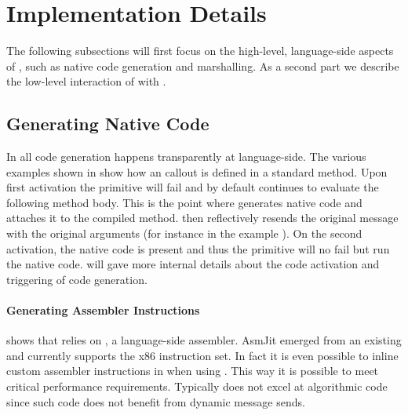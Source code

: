 \section{Implementation Details}

The following subsections will first focus on the high-level, language-side aspects of \NB, such as native code generation and marshalling.
As a second part we describe the low-level interaction of \NB with \B.

\subsection{Generating Native Code}

In \NB all code generation happens transparently at language-side.
The various examples shown in  show how an \FFI callout is defined in a standard method.
Upon first activation the \NB primitive will fail and by default continues to evaluate the following method body.
This is the point where \NB generates native code and attaches it to the compiled method.
\NB then reflectively resends the original message with the original arguments (for instance  in the example ).
On the second activation, the native code is present and thus the primitive will no fail but run the native code.
 will gave more internal details about the code activation and triggering of code generation.

\paragraph{Generating Assembler Instructions}

 shows that \NB relies on , a language-side assembler.
AsmJit emerged from an existing  and currently supports the x86 instruction set.
In fact it is even possible to inline custom assembler instructions in \PH when using \NB.
This way it is possible to meet critical performance requirements.
Typically \PH does not excel at algorithmic code since such code does not benefit from dynamic message sends.


